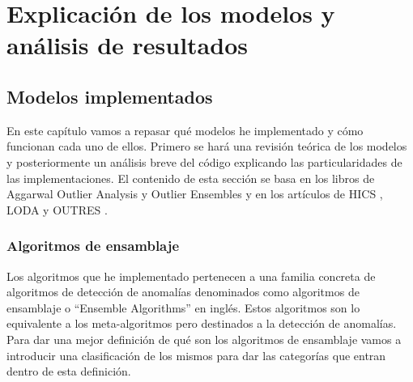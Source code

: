 \part{Explicación de los modelos y análisis de resultados}
\label{part:explicacionmodelos_analisisrresultados}

\chapter{Modelos implementados}
\label{chapter:modelos}

En este capítulo vamos a repasar qué modelos he implementado y cómo funcionan cada uno de ellos. Primero se hará una revisión teórica de los modelos y posteriormente un análisis breve del código explicando las particularidades de las implementaciones. El contenido de esta sección se basa en los libros de Aggarwal Outlier Analysis \cite{aggarwal_outlier_2017-1} y Outlier Ensembles \cite{aggarwal_outlier_2017} y en los artículos de HICS \cite{fabian_keller_hics:_2012}, LODA \cite{pevny_loda:_2016} y OUTRES \cite{muller_statistical_2011}.

\section{Algoritmos de ensamblaje}

Los algoritmos que he implementado pertenecen a una familia concreta de algoritmos de detección de anomalías denominados como algoritmos de ensamblaje o ``Ensemble Algorithms'' en inglés. Estos algoritmos son lo equivalente a los meta-algoritmos pero destinados a la detección de anomalías. Para dar una mejor definición de qué son los algoritmos de ensamblaje vamos a introducir una clasificación de los mismos para dar las categorías que entran dentro de esta definición.

